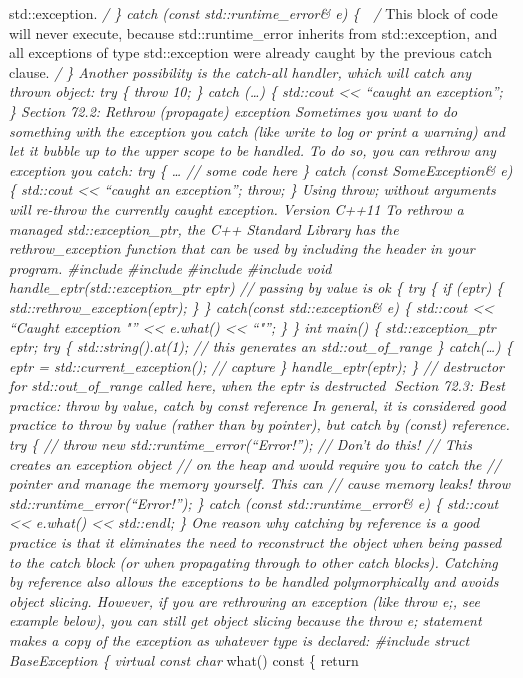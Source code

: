 std::exception. \emph{/ \} catch (const std::runtime\_error\& e) \{  /}
This block of code will never execute, because std::runtime\_error
inherits from std::exception, and all exceptions of type std::exception
were already caught by the previous catch clause. \emph{/ \} Another
possibility is the catch-all handler, which will catch any thrown
object: try \{ throw 10; \} catch (\ldots) \{ std::cout
\textless\textless{} ``caught an exception''; \} Section 72.2: Rethrow
(propagate) exception Sometimes you want to do something with the
exception you catch (like write to log or print a warning) and let it
bubble up to the upper scope to be handled. To do so, you can rethrow
any exception you catch: try \{ \ldots{} // some code here \} catch
(const SomeException\& e) \{ std::cout \textless\textless{} ``caught an
exception''; throw; \} Using throw; without arguments will re-throw the
currently caught exception. Version C++11 To rethrow a managed
std::exception\_ptr, the C++ Standard Library has the rethrow\_exception
function that can be used by including the header in your program.
\#include \#include \#include \#include void
handle\_eptr(std::exception\_ptr eptr) // passing by value is ok \{ try
\{ if (eptr) \{ std::rethrow\_exception(eptr); \} \} catch(const
std::exception\& e) \{ std::cout \textless\textless{} ``Caught exception
"'' \textless\textless{} e.what() \textless\textless{} ``"\n''; \} \}
int main() \{ std::exception\_ptr eptr; try \{ std::string().at(1); //
this generates an std::out\_of\_range \} catch(\ldots) \{ eptr =
std::current\_exception(); // capture \} handle\_eptr(eptr); \} //
destructor for std::out\_of\_range called here, when the eptr is
destructed Section 72.3: Best practice: throw by value, catch by const
reference In general, it is considered good practice to throw by value
(rather than by pointer), but catch by (const) reference. try \{ //
throw new std::runtime\_error(``Error!''); // Don't do this! // This
creates an exception object // on the heap and would require you to
catch the // pointer and manage the memory yourself. This can // cause
memory leaks! throw std::runtime\_error(``Error!''); \} catch (const
std::runtime\_error\& e) \{ std::cout \textless\textless{} e.what()
\textless\textless{} std::endl; \} One reason why catching by reference
is a good practice is that it eliminates the need to reconstruct the
object when being passed to the catch block (or when propagating through
to other catch blocks). Catching by reference also allows the exceptions
to be handled polymorphically and avoids object slicing. However, if you
are rethrowing an exception (like throw e;, see example below), you can
still get object slicing because the throw e; statement makes a copy of
the exception as whatever type is declared: \#include struct
BaseException \{ virtual const char} what() const \{ return
